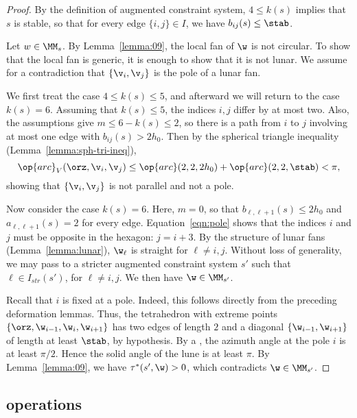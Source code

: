 \begin{proof}
By the definition of augmented constraint system, $4\le k(s)$ implies
that $s$ is stable, so that for every edge $\{i,j\}\in I$, we have
$b_{i j}(s) \le\stab$.

Let $w\in \MM_s$.  By Lemma~\ref{lemma:09}, the local fan of $\w$  is not circular.
To show that the local fan is generic, it is enough to show that it is not lunar.
We assume for a contradiction that $\{\v_i,\v_j\}$ is the pole of a lunar fan.

We first treat the case  $4\le k(s)\le 5$,
and afterward we will return to the case $k(s)=6$. 
Assuming that  $k(s)\le 5$, the indices $i,j$ differ by at most two.
Also, the assumptions give $m\le 6-k(s)\le 2$, so there is a path from
$i$ to $j$ involving at most one edge with $b_{i j}(s)>2h_0$.
Then by the spherical triangle inequality (Lemma~\ref{lemma:sph-tri-ineq}),
\begin{equation}\label{eqn:pole}
\op{arc}_V(\orz,\v_i,\v_j) \le \op{arc}(2,2,2h_0) + \op{arc}(2,2,\stab) < \pi,
\end{equation}
showing that $\{\v_i,\v_j\}$ is not parallel and not a pole.

Now consider the case $k(s)=6$.  Here, $m=0$, so that $b_{\ell,\ell+1}(s)\le 2h_0$
and $a_{\ell,\ell+1}(s)=2$
for every edge. Equation~\ref{eqn:pole} shows that the indices $i$ and $j$
must be opposite in the hexagon: $j = i+3$.  By the structure of lunar fans
(Lemma~\ref{lemma:lunar}), $\w_\ell$ is straight for $\ell\ne i,j$.  Without
loss of generality, we may
pass to a stricter augmented constraint system $s'$ such that
$\ell\in I_{str}(s')$, for $\ell\ne i,j$.  We then have $\w\in \MM_{s'}$.

Recall that $i$ is fixed at a pole. 
  Indeed, this follows directly from the preceding deformation
lemmas.  Thus, the tetrahedron with extreme points
$\{\orz,\w_{i-1},\w_i,\w_{i+1}\}$ has two edges
of length $2$ and a diagonal $\{\w_{i-1},\w_{i+1}\}$ of length at least
$\stab$, by hypothesis.  By a , 
the azimuth angle at the pole $i$ is at least $\pi/2$.
Hence the solid angle of the lune is at least $\pi$.  By Lemma~\ref{lemma:09},
we have $\tau^*(s',\w)>0$, which contradicts $\w\in \MM_{s'}$.
\end{proof}



\subsection{operations}

